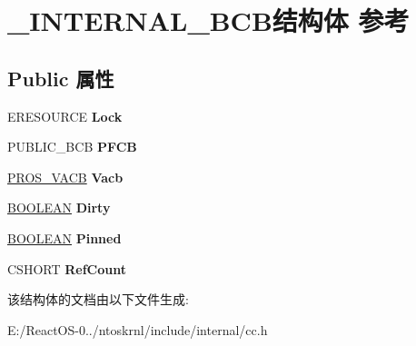 \hypertarget{struct___i_n_t_e_r_n_a_l___b_c_b}{}\section{\+\_\+\+I\+N\+T\+E\+R\+N\+A\+L\+\_\+\+B\+C\+B结构体 参考}
\label{struct___i_n_t_e_r_n_a_l___b_c_b}
\subsection*{Public 属性}
\begin{DoxyCompactItemize}
\item 
\mbox{\label{struct___i_n_t_e_r_n_a_l___b_c_b_a401008592f7416efc15a8742a1f4cede}} 
E\+R\+E\+S\+O\+U\+R\+CE {\bfseries Lock}
\item 
\mbox{\label{struct___i_n_t_e_r_n_a_l___b_c_b_afb1dc886b4e3e15b2dac93e7b707bb99}} 
P\+U\+B\+L\+I\+C\+\_\+\+B\+CB {\bfseries P\+F\+CB}
\item 
\mbox{\label{struct___i_n_t_e_r_n_a_l___b_c_b_aaf7032e6f91202d5e1b177e0ef11ee36}} 
\hyperlink{struct___r_o_s___v_a_c_b}{P\+R\+O\+S\+\_\+\+V\+A\+CB} {\bfseries Vacb}
\item 
\mbox{\label{struct___i_n_t_e_r_n_a_l___b_c_b_a8739d1b8725c074bb8727f3b66e3d43d}} 
\hyperlink{_processor_bind_8h_a112e3146cb38b6ee95e64d85842e380a}{B\+O\+O\+L\+E\+AN} {\bfseries Dirty}
\item 
\mbox{\label{struct___i_n_t_e_r_n_a_l___b_c_b_ae2a28881523d65f6236ca0f42095b351}} 
\hyperlink{_processor_bind_8h_a112e3146cb38b6ee95e64d85842e380a}{B\+O\+O\+L\+E\+AN} {\bfseries Pinned}
\item 
\mbox{\label{struct___i_n_t_e_r_n_a_l___b_c_b_a4f6512444c5bfe8caaa8a49e487e8d64}} 
C\+S\+H\+O\+RT {\bfseries Ref\+Count}
\end{DoxyCompactItemize}


该结构体的文档由以下文件生成\+:\begin{DoxyCompactItemize}
\item 
E\+:/\+React\+O\+S-\/0../ntoskrnl/include/internal/cc.\+h\end{DoxyCompactItemize}
